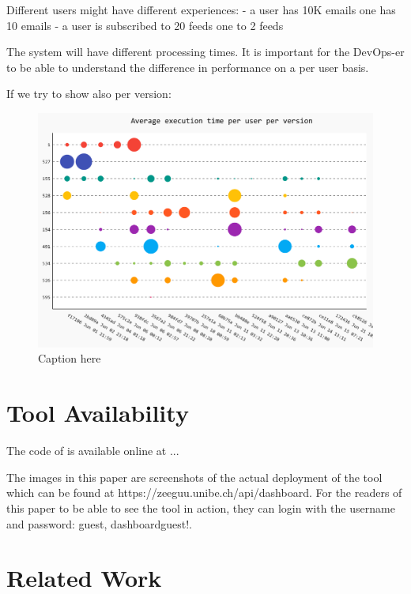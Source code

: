 \documentclass[conference]{IEEEtran}
\begin{document}
  Different users might have different experiences: 
  - a user has 10K emails one has 10 emails
  - a user is subscribed to 20 feeds one to 2 feeds

  The system will have different processing times. 
  It is important for the DevOps-er to be able to understand the difference in performance on a per user basis. 

  If we try to show also per version: 

  \begin{figure}[h!]
    \centering
    \includegraphics[width=\linewidth]{time_per_user_per_version}
    \caption{Caption here}
    \label{fig:figure1}
  \end{figure}



\section{Tool Availability}

The code of \tool is available online at ...

The images in this paper are screenshots of the actual deployment of the tool which can be found at {https://zeeguu.unibe.ch/api/dashboard}. For the readers of this paper to be able to see the tool in action, they can login with the username and password: guest, dashboardguest!. 

\section{Related Work}
\end{document}
